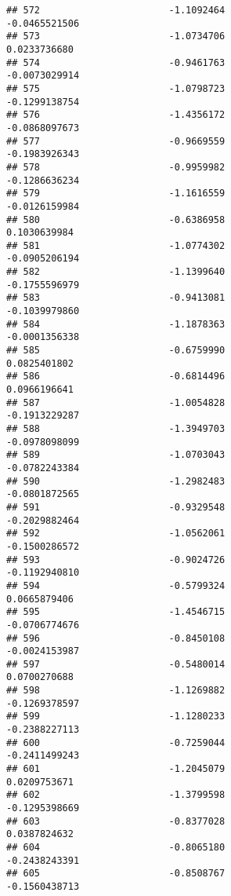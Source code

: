 \documentclass[
]{article}
\begin{document}
\begin{verbatim}
## 572                       -1.1092464                         -0.0465521506
## 573                       -1.0734706                          0.0233736680
## 574                       -0.9461763                         -0.0073029914
## 575                       -1.0798723                         -0.1299138754
## 576                       -1.4356172                         -0.0868097673
## 577                       -0.9669559                         -0.1983926343
## 578                       -0.9959982                         -0.1286636234
## 579                       -1.1616559                         -0.0126159984
## 580                       -0.6386958                          0.1030639984
## 581                       -1.0774302                         -0.0905206194
## 582                       -1.1399640                         -0.1755596979
## 583                       -0.9413081                         -0.1039979860
## 584                       -1.1878363                         -0.0001356338
## 585                       -0.6759990                          0.0825401802
## 586                       -0.6814496                          0.0966196641
## 587                       -1.0054828                         -0.1913229287
## 588                       -1.3949703                         -0.0978098099
## 589                       -1.0703043                         -0.0782243384
## 590                       -1.2982483                         -0.0801872565
## 591                       -0.9329548                         -0.2029882464
## 592                       -1.0562061                         -0.1500286572
## 593                       -0.9024726                         -0.1192940810
## 594                       -0.5799324                          0.0665879406
## 595                       -1.4546715                         -0.0706774676
## 596                       -0.8450108                         -0.0024153987
## 597                       -0.5480014                          0.0700270688
## 598                       -1.1269882                         -0.1269378597
## 599                       -1.1280233                         -0.2388227113
## 600                       -0.7259044                         -0.2411499243
## 601                       -1.2045079                          0.0209753671
## 602                       -1.3799598                         -0.1295398669
## 603                       -0.8377028                          0.0387824632
## 604                       -0.8065180                         -0.2438243391
## 605                       -0.8508767                         -0.1560438713

\end{verbatim}
\end{document}
